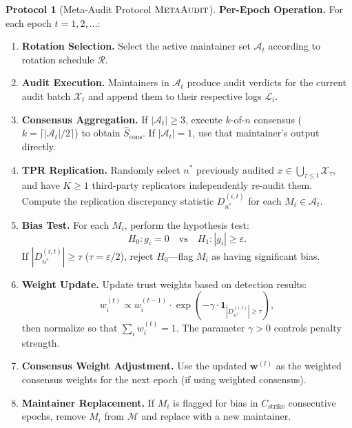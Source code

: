 \documentclass[11pt,a4paper]{article}
\theoremstyle{definition}
\newtheorem{protocol}[theorem]{Protocol}
\newcommand{\ind}[1]{\mathbf{1}_{#1}}
\newcommand{\MetaAudit}{\textsc{MetaAudit}}
\begin{document}
\begin{protocol}[Meta-Audit Protocol $\MetaAudit$]
\noindent
\textbf{Per-Epoch Operation.} For each epoch $t = 1, 2, \ldots$:
\begin{enumerate}[leftmargin=*, label=\textbf{E\arabic*}]
    \item \textbf{Rotation Selection.} Select the active maintainer set $\mathcal{A}_t$ according to rotation schedule $\mathcal{R}$.
    \item \textbf{Audit Execution.} Maintainers in $\mathcal{A}_t$ produce audit verdicts for the current audit batch $\mathcal{X}_t$ and append them to their respective logs $\mathcal{L}_i$.
    \item \textbf{Consensus Aggregation.} If $|\mathcal{A}_t| \geq 3$, execute $k$-of-$n$ consensus ($k = \lceil |\mathcal{A}_t|/2 \rceil$) to obtain $\hat{S}_{\text{cons}}$. If $|\mathcal{A}_t| = 1$, use that maintainer's output directly.
    \item \textbf{TPR Replication.} Randomly select $n^*$ previously audited $x \in \bigcup_{\tau \leq t} \mathcal{X}_\tau$, and have $K \geq 1$ third-party replicators independently re-audit them. Compute the replication discrepancy statistic $D_{n^*}^{(i,t)}$ for each $M_i \in \mathcal{A}_t$.
    \item \textbf{Bias Test.} For each $M_i$, perform the hypothesis test:
    \begin{equation*}
        H_0: g_i = 0 \quad \text{vs} \quad H_1: |g_i| \geq \varepsilon.
    \end{equation*}
    If $|D_{n^*}^{(i,t)}| \geq \tau$ ($\tau = \varepsilon/2$), reject $H_0$---flag $M_i$ as having significant bias.
    \item \textbf{Weight Update.} Update trust weights based on detection results:
    \begin{equation}\label{eq:weight_update}
        w_i^{(t)} \propto w_i^{(t-1)} \cdot \exp\left(-\gamma \cdot \ind{|D_{n^*}^{(i,t)}| \geq \tau}\right),
    \end{equation}
    then normalize so that $\sum_i w_i^{(t)} = 1$. The parameter $\gamma > 0$ controls penalty strength.
    \item \textbf{Consensus Weight Adjustment.} Use the updated $\mathbf{w}^{(t)}$ as the weighted consensus weights for the next epoch (if using weighted consensus).
    \item \textbf{Maintainer Replacement.} If $M_i$ is flagged for bias in $C_{\text{strike}}$ consecutive epochs, remove $M_i$ from $\mathcal{M}$ and replace with a new maintainer.
\end{enumerate}
\end{protocol}
\end{document}
